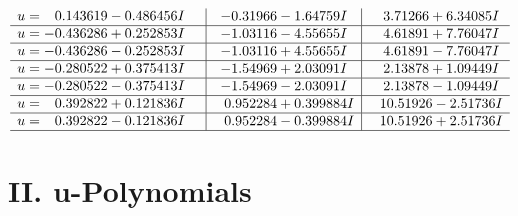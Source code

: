 \documentclass[1p]{elsarticle_modified}
\theoremstyle{definition}
\begin{document}
$$\begin{array}{c|c|c}
\begin{aligned}
u &= \phantom{-}0.143619 - 0.486456 I\end{aligned}
 & -0.31966 - 1.64759 I & \phantom{-}3.71266 + 6.34085 I \\ \hline\begin{aligned}
u &= -0.436286 + 0.252853 I\end{aligned}
 & -1.03116 - 4.55655 I & \phantom{-}4.61891 + 7.76047 I \\ \hline\begin{aligned}
u &= -0.436286 - 0.252853 I\end{aligned}
 & -1.03116 + 4.55655 I & \phantom{-}4.61891 - 7.76047 I \\ \hline\begin{aligned}
u &= -0.280522 + 0.375413 I\end{aligned}
 & -1.54969 + 2.03091 I & \phantom{-}2.13878 + 1.09449 I \\ \hline\begin{aligned}
u &= -0.280522 - 0.375413 I\end{aligned}
 & -1.54969 - 2.03091 I & \phantom{-}2.13878 - 1.09449 I \\ \hline\begin{aligned}
u &= \phantom{-}0.392822 + 0.121836 I\end{aligned}
 & \phantom{-}0.952284 + 0.399884 I & \phantom{-}10.51926 - 2.51736 I \\ \hline\begin{aligned}
u &= \phantom{-}0.392822 - 0.121836 I\end{aligned}
 & \phantom{-}0.952284 - 0.399884 I & \phantom{-}10.51926 + 2.51736 I\\
 \hline 
 \end{array}$$\newpage
\newpage\renewcommand{\arraystretch}{1}
\centering \section*{ II. u-Polynomials}
\end{document}
